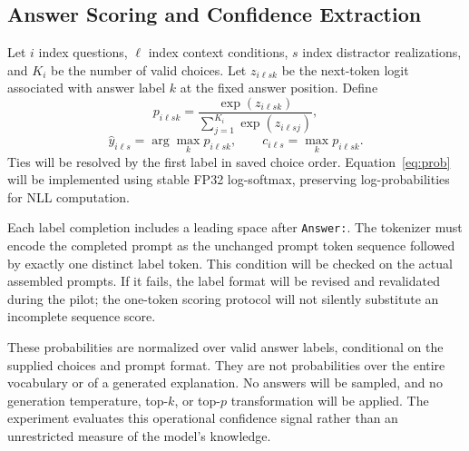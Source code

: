 \documentclass[conference]{IEEEtran}
\begin{document}
\subsection{Answer Scoring and Confidence Extraction}
Let $i$ index questions, $\ell$ index context conditions, $s$ index distractor realizations, and $K_i$ be the number of valid choices. Let $z_{i\ell sk}$ be the next-token logit associated with answer label $k$ at the fixed answer position. Define
\begin{equation}
p_{i\ell sk}=\frac{\exp(z_{i\ell sk})}{\sum_{j=1}^{K_i}\exp(z_{i\ell sj})},
\label{eq:prob}
\end{equation}
\begin{equation}
\hat y_{i\ell s}=\arg\max_k p_{i\ell sk},\qquad
c_{i\ell s}=\max_k p_{i\ell sk}.
\end{equation}
Ties will be resolved by the first label in saved choice order. Equation~\eqref{eq:prob} will be implemented using stable FP32 log-softmax, preserving log-probabilities for NLL computation.

Each label completion includes a leading space after \texttt{Answer:}. The tokenizer must encode the completed prompt as the unchanged prompt token sequence followed by exactly one distinct label token. This condition will be checked on the actual assembled prompts. If it fails, the label format will be revised and revalidated during the pilot; the one-token scoring protocol will not silently substitute an incomplete sequence score.

These probabilities are normalized over valid answer labels, conditional on the supplied choices and prompt format. They are not probabilities over the entire vocabulary or of a generated explanation. No answers will be sampled, and no generation temperature, top-$k$, or top-$p$ transformation will be applied. The experiment evaluates this operational confidence signal rather than an unrestricted measure of the model's knowledge.
\end{document}
